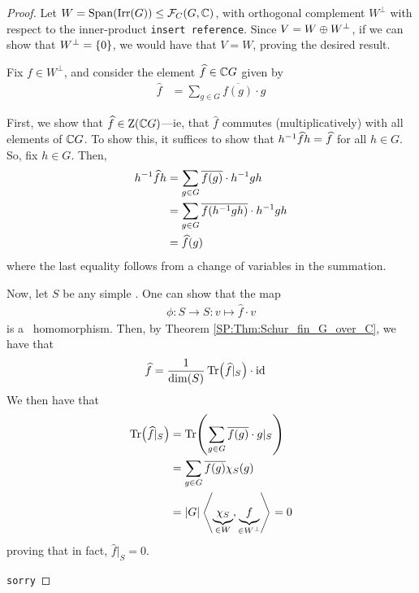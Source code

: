\begin{proof}
    Let $W = \operatorname{Span}\!\left( \operatorname{Irr}\!\left( G \right) \right) \leq \mathcal{F}_C\!\left( G, \mathbb{C} \right)$, with orthogonal complement $W^\perp$ with respect to the inner-product \verb|insert reference|. Since $V = W \oplus W^\perp$, if we can show that $W^\perp = \left\{ 0 \right\}$, we would have that $V = W$, proving the desired result.

    Fix $f \in W^\perp$, and consider the element $\widehat{f} \in \mathbb{C} G$ given by  %
    \begin{align*}
        \hat{f} &= \sum_{g \in G} \overline{f(g)} \cdot g
    \end{align*}

    First, we show that $\widehat{f} \in \operatorname{Z}\!\left( \mathbb{C} G \right)$---ie, that $\hat{f}$ commutes (multiplicatively) with all elements of $\mathbb{C} G$. To show this, it suffices to show that $h^{-1} \widehat{f} h = \widehat{f}$ for all $h \in G$. So, fix $h \in G$. Then,
    \begin{align*}
        h\inv \hat{f} h &=
        \sum_{g \in G} \overline{f(g)} \cdot h\inv g h \\
        &= \sum_{g \in G} \overline{\fof{h\inv g h}} \cdot h\inv g h \\ %
        &= \hat{f}(g)
    \end{align*}
    where the last equality follows from a change of variables in the summation.

    Now, let $S$ be any simple \CGM. One can show that the map  %
    \begin{align*}
        \phi : S \to S : v \mapsto \hat{f} \cdot v
    \end{align*}
    is a \CGM\ homomorphism. %
    Then, by Theorem \ref{SP:Thm:Schur_fin_G_over_C}, we have that
    \begin{align*}
        \widehat{f} &= \frac{1}{\dim\!\left( S \right)} \operatorname{Tr}\!\left( \widehat{f}\vert_S \right) \cdot \operatorname{id}
    \end{align*}
    We then have that
    \begin{align*}
        \operatorname{Tr}\!\left( \widehat{f}\vert_S \right) &= \operatorname{Tr}\!\left( \sum_{g \in G} \overline{f(g)} \cdot g\vert_{S} \right) \\
        &= \sum_{g \in G} \overline{f(g)} \chi_S(g) \\
        &= \left\lvert G \right\rvert \left\langle \underbrace{\chi_S}_{\in W}, \underbrace{f}_{\in W^\perp} \right\rangle = 0
    \end{align*}
    proving that in fact, $\hat{f}\vert_S = 0$.
    
    \verb|sorry| %
\end{proof}